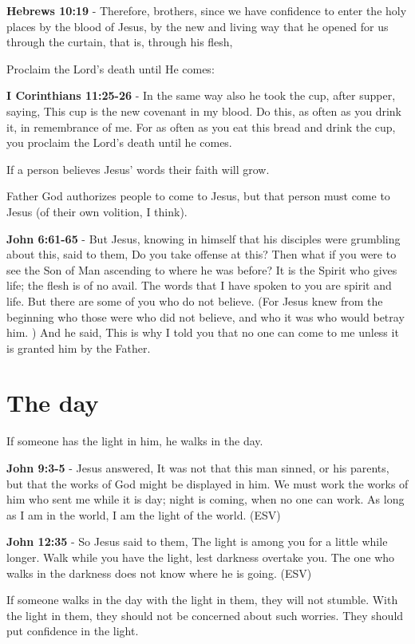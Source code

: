 \documentclass[11pt]{article}
\begin{document}
\textbf{Hebrews 10:19} - Therefore, brothers, since we have confidence to enter the holy places by the blood of Jesus, by the new and living way that he opened for us through the curtain, that is, through his flesh,

Proclaim the Lord's death until He comes:

\textbf{I Corinthians 11:25-26} - In the same way also he took the cup, after supper, saying, This cup is the new covenant in my blood. Do this, as often as you drink it, in remembrance of me. For as often as you eat this bread and drink the cup, you proclaim the Lord's death until he comes.

If a person believes Jesus' words their faith will grow.

Father God authorizes people to come to Jesus, but that person must come to Jesus (of their own volition, I think).

\textbf{John 6:61-65} - But Jesus, knowing in himself that his disciples were grumbling about this, said to them, Do you take offense at this?  Then what if you were to see the Son of Man ascending to where he was before?  It is the Spirit who gives life; the flesh is of no avail. The words that I have spoken to you are spirit and life.  But there are some of you who do not believe. (For Jesus knew from the beginning who those were who did not believe, and who it was who would betray him. ) And he said, This is why I told you that no one can come to me unless it is granted him by the Father.

\section{The day}
\label{sec:org28e19d8}
If someone has the light in him, he walks in the day.

\textbf{John 9:3-5} - Jesus answered, It was not that this man sinned, or his parents, but that the works of God might be displayed in him. We must work the works of him who sent me while it is day; night is coming, when no one can work. As long as I am in the world, I am the light of the world. (ESV)

\textbf{John 12:35} -  So Jesus said to them, The light is among you for a little while longer.  Walk while you have the light, lest darkness overtake you.  The one who walks in the darkness does not know where he is going.  (ESV)

If someone walks in the day with the light in them, they will not stumble.
With the light in them, they should not be concerned about such worries.
They should put confidence in the light.
\end{document}
